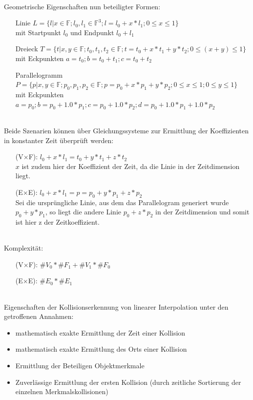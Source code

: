 \ \\
		Geometrische Eigenschaften nun beteiligter Formen:
		\begin{itemize}
			\item [Linie] $L = \{l | x\in\mathbb{F} ; l_0, l_1 \in \mathbb{F}^3 ; l = l_0 + x * l_1; 0\le x\le 1 \}$ \\
			mit Startpunkt $l_0$ und Endpunkt $l_0 + l_1$
		\item [Dreieck] $T = \{t | x,y \in\mathbb{F}; t_0, t_1, t_2 \in \mathbb{F}; t = t_0 + x*t_1 + y*t_2; 0\le (x+y) \le 1\}$\\
			mit Eckpunkten $a = t_0 ; b = t_0 + t_1 ; c = t_0 + t_2$ 
			\item [Parallelogramm] $P = \{p | x,y \in\mathbb{F}; p_0, p_1, p_2 \in \mathbb{F}; p = p_0 + x*p_1 + y*p_2; 0\le x\le 1; 0\le y\le 1\}$\\
			mit Eckpunkten $a = p_0 ; b = p_0 + 1.0*p_1 ; c = p_0 + 1.0*p_2; d = p_0 + 1.0*p_1 + 1.0*p_2$ 
		\end{itemize}
\ \\
		Beide Szenarien können über Gleichungssysteme zur Ermittlung der Koeffizienten in konstanter Zeit überprüft werden:
		\begin{itemize}
			\item [(V$\times$F):] $l_0 + x * l_1 = t_0 + y*t_1 + z*t_2$\\
				$x$ ist zudem hier der Koeffizient der Zeit, da die Linie in der Zeitdimension liegt.
			\item [(E$\times$E):] $l_0 + x * l_1 = p = p_0 + y*p_1 + z*p_2$\\
				Sei die ursprüngliche Linie, aus dem das Parallelogram generiert wurde $p_0+y*p_1$, so liegt die andere Linie $p_0 + z*p_2$ in der Zeitdimension und somit ist hier z der Zeitkoeffizient.
		\end{itemize}
\ \\
		Komplexität:
\begin{itemize}
			\item [(V$\times$F):] $\#V_0*\#F_1 + \#V_1*\#F_0$
			\item [(E$\times$E):] $\#E_0*\#E_1$
		\end{itemize}
\ \\
		Eigenschaften der Kollisionserkennung von linearer Interpolation unter den getroffenen Annahmen:
		\begin{itemize}
			\item mathematisch exakte Ermittlung der Zeit einer Kollision
			\item mathematisch exakte Ermittlung des Orts einer Kollision
			\item Ermittlung der Beteiligen Objektmerkmale
			\item Zuverlässige Ermittlung der ersten Kollision (durch zeitliche Sortierung der einzelnen Merkmalskollisionen)
		\end{itemize}
